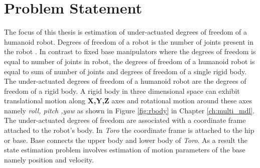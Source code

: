 \section{Problem Statement}
    The focus of this thesis is estimation of under-actuated degrees of freedom of a humanoid robot.  Degrees of freedom of a robot is the number of joints present in the robot \citep{mur94}. In contrast to fixed base manipulators where the degrees of freedom is equal to number of joints in robot, the degrees of freedom of a humanoid robot is equal to sum of number of joints and degrees of freedom of a single rigid body. The under-actuated degrees of freedom of a humanoid robot are the degrees of freedom of a  rigid body.  A rigid body in three dimensional space can exhibit translational motion along \textbf{X,Y,Z} axes and rotational motion around these axes namely \emph{ roll, pitch ,yaw} as shown in Figure \ref{fig:rbody} in Chapter \ref{ch:multi_mdl}. The under-actuated degrees of freedom are associated with a coordinate frame attached to the robot's body. In \emph{Toro} the coordinate frame is attached to the hip or base. Base connects the upper body and lower body of \emph{Toro}. As a result the state estimation problem involves estimation of motion parameters of the base namely position and velocity.

